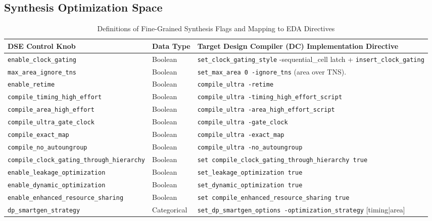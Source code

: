 \subsection{Synthesis Optimization Space}
\begin{table}[htbp]
\centering
\caption{Definitions of Fine-Grained Synthesis Flags and Mapping to EDA Directives}
\label{tab:synthesis_flags}
\begin{tabularx}{\textwidth}{@{}l l X @{}}
\toprule
\textbf{DSE Control Knob} & \textbf{Data Type} & \textbf{Target Design Compiler (DC) Implementation Directive} \\ \midrule
\texttt{enable\_clock\_gating} & Boolean & \texttt{set\_clock\_gating\_style} -sequential\_cell latch + \texttt{insert\_clock\_gating} \\ \addlinespace
\texttt{max\_area\_ignore\_tns} & Boolean & \texttt{set\_max\_area 0 -ignore\_tns} (area over TNS). \\ \addlinespace
\texttt{enable\_retime}        & Boolean & \texttt{compile\_ultra -retime} \\ \addlinespace
\texttt{compile\_timing\_high\_effort}  & Boolean & \texttt{compile\_ultra -timing\_high\_effort\_script} \\ \addlinespace
\texttt{compile\_area\_high\_effort}    & Boolean & \texttt{compile\_ultra -area\_high\_effort\_script} \\ \addlinespace
\texttt{compile\_ultra\_gate\_clock}    & Boolean & \texttt{compile\_ultra -gate\_clock} \\ \addlinespace
\texttt{compile\_exact\_map}            & Boolean & \texttt{compile\_ultra -exact\_map} \\ \addlinespace
\texttt{compile\_no\_autoungroup}       & Boolean & \texttt{compile\_ultra -no\_autoungroup} \\ \addlinespace
\texttt{compile\_clock\_gating\_through\_hierarchy} & Boolean & \texttt{set compile\_clock\_gating\_through\_hierarchy true} \\ \addlinespace
\texttt{enable\_leakage\_optimization} & Boolean & \texttt{set\_leakage\_optimization true} \\ \addlinespace
\texttt{enable\_dynamic\_optimization} & Boolean & \texttt{set\_dynamic\_optimization true} \\ \addlinespace
\texttt{enable\_enhanced\_resource\_sharing} & Boolean & \texttt{set compile\_enhanced\_resource\_sharing true} \\ \addlinespace
\texttt{dp\_smartgen\_strategy} & Categorical & \texttt{set\_dp\_smartgen\_options -optimization\_strategy} [timing|area] \\ \bottomrule
\end{tabularx}
\end{table}